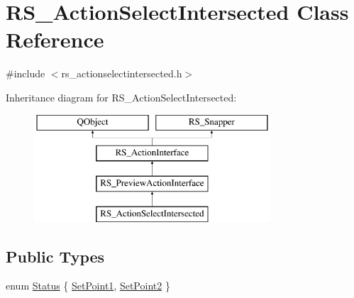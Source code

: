 \hypertarget{classRS__ActionSelectIntersected}{\section{R\-S\-\_\-\-Action\-Select\-Intersected Class Reference}
\label{classRS__ActionSelectIntersected}
}


{\ttfamily \#include $<$rs\-\_\-actionselectintersected.\-h$>$}

Inheritance diagram for R\-S\-\_\-\-Action\-Select\-Intersected\-:\begin{figure}[H]
\begin{center}
\leavevmode
\includegraphics[height=4.000000cm]{classRS__ActionSelectIntersected}
\end{center}
\end{figure}
\subsection*{Public Types}
\begin{DoxyCompactItemize}
\item 
enum \hyperlink{classRS__ActionSelectIntersected_a0e407d32b8e302bb84557353cd6f2656}{Status} \{ \hyperlink{classRS__ActionSelectIntersected_a0e407d32b8e302bb84557353cd6f2656a62860957003f787cda9eed5b013b8d42}{Set\-Point1}, 
\hyperlink{classRS__ActionSelectIntersected_a0e407d32b8e302bb84557353cd6f2656af6505113cedea9f621f8ade506d3d7a1}{Set\-Point2}
 \}
\end{DoxyCompactItemize}
